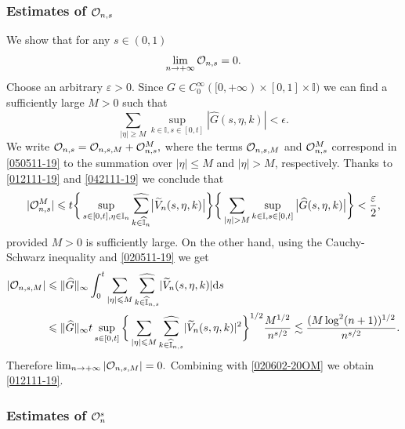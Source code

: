 \documentclass[EJP]{ejpecp} %
\newcommand\T{{\mathbb I}}
\newcommand\eps{\epsilon}
\renewcommand{\ge}{\geqslant}
\renewcommand{\le}{\leqslant}
\newcommand{\dd  }{\mathrm{d}}
\renewcommand{\hat}{\widehat}
\renewcommand{\tilde}{\widetilde}
\numberwithin{equation}{section}
\begin{document}
\subsubsection*{Estimates of ${\cal O}_{n,s}$}
We show that
for any $s\in(0,1)$ 
\begin{equation}
\label{012111-19}
\lim_{n\to+\infty}{\cal O}_{n,s}=0.
\end{equation}
Choose an arbitrary $\varepsilon>0$. Since $G\in
C_0^\infty([0,+\infty)\times[0,1]\times\T)$ we can find a sufficiently
large $M>0$ such that
\begin{equation}
\label{012111-19a}
\sum_{|\eta|\ge M}\sup_{k\in\T,s\in[0,t]}|\hat G(s,\eta,k)|<\eps.
\end{equation}
We  write
$
{\cal O}_{n,s}={\cal O}_{n,s,M}+{\cal O}_{n,s}^M,
$
where the terms ${\cal O}_{n,s,M}$ and ${\cal O}_{n,s}^M$ correspond in \eqref{050511-19}
to the summation over $|\eta|\le M$ and $|\eta|> M$, respectively.
Thanks to \eqref{012111-19} and \eqref{042111-19} we conclude that
\begin{equation}
\label{020602-20OM}
|{\cal O}_{n,s}^M|\le t\bigg\{\sup_{s\in[0,t],\eta\in\T_n}\underset{{k\in \widehat{\T}_n}}{{\hat\sum}}\big|\tilde V_n(s,\eta,k)\big|\bigg\}\bigg\{ \sum_{|\eta|> M}\sup_{k\in\T,s\in[0,t]}\big|\hat G(s,\eta,k)\big|\bigg\}<\frac{\varepsilon}{2},
\end{equation}
provided $M>0$ is sufficiently large. On the other hand, using the
Cauchy-Schwarz inequality and \eqref{020511-19} we get
\begin{align*}
|{\cal O}_{n,s,M}|&\le \|\hat G\|_\infty\int_0^t \sum_{|\eta|\le M}\underset{{k\in \widehat{\T}_{n,s}}}{{\hat\sum}}|\tilde V_n(s,\eta,k)| \dd
  s\\
&
\le \|\hat G\|_\infty t \sup_{s\in[0,t]}\bigg\{\sum_{|\eta|\le
  M}\underset{{k\in \widehat{\T}_{n,s}}}{{\hat\sum}}|\tilde
  V_n(s,\eta,k)|^2\bigg\}^{1/2} \frac{M^{1/2}}{n^{s/2}}\lesssim
  \frac{(M\log^2(n+1))^{1/2}}{n^{s/2}}.
\end{align*}
Therefore
$
\lim_{n\to+\infty}|{\cal O}_{n,s,M}|=0.
$
Combining with  \eqref{020602-20OM} we obtain \eqref{012111-19}.



\subsubsection*{Estimates of ${\cal O}_{n}^s$}
\end{document}
